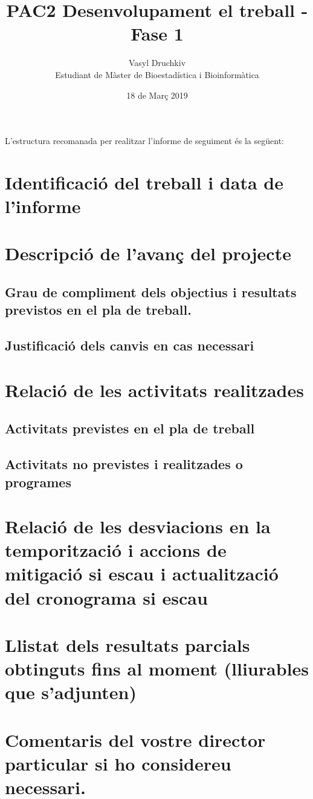 \documentclass[]{article}
\title{PAC2  Desenvolupament el treball - Fase 1}
\date{18 de Març 2019}
\author{Vasyl Druchkiv \\ Estudiant de Màster de Bioestadística i Bioinformàtica}
\begin{document}
\maketitle
\makeatletter
\renewcommand{\@seccntformat}[1]{}
\makeatother
\begin{spacing}{0.1}
\tableofcontents
\end{spacing}

L'estructura recomanada per realitzar l'informe de seguiment és la següent:

    \section{Identificació del treball i data de l'informe}

    \section{Descripció de l'avanç del projecte} 

     \subsection{Grau de compliment dels objectius i resultats previstos en el pla de treball.}

     \subsection{Justificació dels canvis en cas necessari}

   \section{Relació de les activitats realitzades}

         \subsection{Activitats previstes en el pla de treball}

         \subsection{Activitats no previstes i realitzades o programes}

   \section{Relació de les desviacions en la temporització i accions de mitigació si escau i actualització del cronograma si escau}

   \section{Llistat dels resultats parcials obtinguts fins al moment (lliurables que s'adjunten)}

   \section{Comentaris del vostre director particular si ho considereu necessari.}
\end{document}
